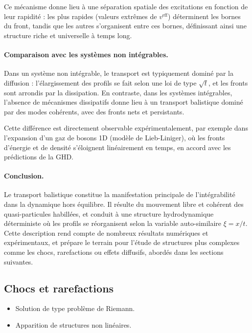 Ce mécanisme donne lieu à une séparation spatiale des excitations en fonction de leur rapidité : les plus rapides (valeurs extrêmes de $v^{\mathrm{eff}}$) déterminent les bornes du front, tandis que les autres s’organisent entre ces bornes, définissant ainsi une structure riche et universelle à temps long.

\paragraph{Comparaison avec les systèmes non intégrables.}
Dans un système non intégrable, le transport est typiquement dominé par la diffusion : l’élargissement des profils se fait selon une loi de type $\sqrt{t}$, et les fronts sont arrondis par la dissipation. En contraste, dans les systèmes intégrables, l’absence de mécanismes dissipatifs donne lieu à un transport balistique dominé par des modes cohérents, avec des fronts nets et persistants.

Cette différence est directement observable expérimentalement, par exemple dans l’expansion d’un gaz de bosons 1D (modèle de Lieb-Liniger), où les fronts d’énergie et de densité s’éloignent linéairement en temps, en accord avec les prédictions de la GHD.

\paragraph{Conclusion.}
Le transport balistique constitue la manifestation principale de l'intégrabilité dans la dynamique hors équilibre. Il résulte du mouvement libre et cohérent des quasi-particules habillées, et conduit à une structure hydrodynamique déterministe où les profils se réorganisent selon la variable auto-similaire $\xi = x/t$. Cette description rend compte de nombreux résultats numériques et expérimentaux, et prépare le terrain pour l’étude de structures plus complexes comme les chocs, rarefactions ou effets diffusifs, abordés dans les sections suivantes.


\subsection{Chocs et rarefactions}
{\color{blue}
\begin{itemize}
    \item Solution de type problème de Riemann.
    \item Apparition de structures non linéaires.
\end{itemize}
}

